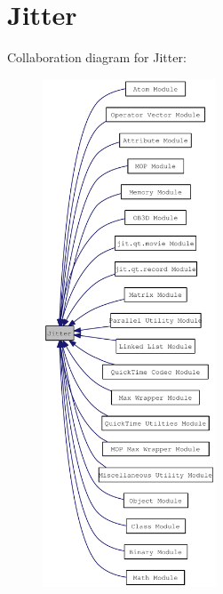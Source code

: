\hypertarget{group__jitter}{
\section{Jitter}
\label{group__jitter}
}


Collaboration diagram for Jitter:\nopagebreak
\begin{figure}[H]
\begin{center}
\leavevmode
\includegraphics[width=146pt]{group__jitter}
\end{center}
\end{figure}
